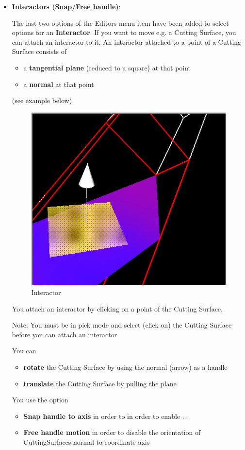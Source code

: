 \begin{itemize}
\clearpage

\item{\bf Interactors (Snap/Free handle)}:

The last two options of the Editors menu item have been added to select options for an 
{\bf Interactor}. If you want to move e.g. a Cutting Surface,
you can attach an interactor to it. An interactor attached to a point of
a Cutting Surface consists of

\begin{itemize}
\item a {\bf tangential plane} (reduced to a square) at that point
\item a {\bf normal} at that point
\end{itemize}
(see example below)

 \latexonly
 \begin{figure}[htp]
  \begin{center}
   \includegraphics[scale=0.7]{renderer/pict/interactor}
   \caption{Interactor}
	\label{fig65a}
  \end{center}
 \end{figure}
 \endlatexonly
 
You attach an interactor by clicking on a point of the Cutting Surface.

Note: You must be in pick mode and select (click on) the Cutting Surface before you 
can attach an interactor

You can
\begin{itemize}
\item {\bf rotate} the Cutting Surface by using the normal (arrow) as a handle 
\item {\bf translate} the Cutting Surface by pulling the plane
\end{itemize}

You use the option
\begin{itemize}
\item {\bf Snap handle to axis} in order to in order to enable ... 
\item {\bf Free handle motion} in order to disable the orientation of 
CuttingSurfaces normal to coordinate axis
\end{itemize}

\end{itemize}
\clearpage

